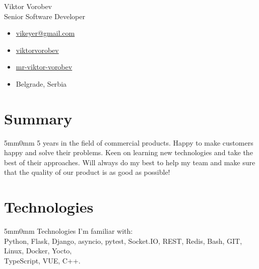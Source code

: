 \documentclass[10pt]{article}
\newcommand{\lmvalue}{5mm}
\newcommand{\rmvalue}{0mm}
\begin{document}
    \begin{minipage}[t]{0.78\linewidth}
    {\fontsize{28pt}{28pt}\selectfont Viktor Vorobev}
        \\[1em]
        {\color{gray}\fontsize{16pt}{16pt}\selectfont Senior Software Developer}
    \end{minipage}
    \hfill%
    \begin{minipage}[t]{0.24\linewidth}
        \begin{flushleft}
            \begin{itemize}
                \item[\color{cyan}\faEnvelope] \href{mailto:vikeyer@gmail.com}{vikeyer@gmail.com}
                \item[\color{cyan}\faGithub] \href{https://github.com/viktorvorobev}{viktorvorobev}
                \item[\color{cyan}\faLinkedin] \href{https://www.linkedin.com/in/mr-viktor-vorobev/}{mr-viktor-vorobev}
                \item[\faBuildingO] Belgrade, Serbia
            \end{itemize}
        \end{flushleft}
    \end{minipage}

    \vspace{3mm}
    \section*{Summary}
    \begin{changemargin}{\lmvalue}{\rmvalue}
        5 years in the field of commercial products.
        Happy to make customers happy and solve their problems.
        Keen on learning new technologies and take the best of their approaches.
        Will always do my best to help my team and make sure that the quality of our product is as good as possible!
    \end{changemargin}
    \section*{Technologies}
    \begin{changemargin}{\lmvalue}{\rmvalue}
        Technologies I'm familiar with:\\
        Python, Flask, Django, asyncio, pytest, Socket.IO, REST, Redis, Bash, GIT, Linux,
        Docker, Yocto, \\
        TypeScript, VUE, C++.
    \end{changemargin}
\end{document}
